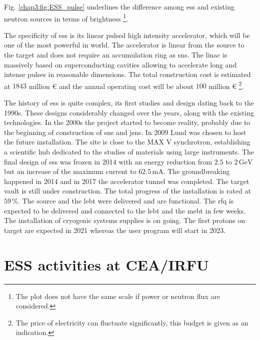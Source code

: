 \begin{refsection}
  Fig. \ref{chap3:fig:ESS_pulse} underlines the difference among \acrshort{ess} and existing neutron sources in terms of brightness \footnote{The plot does not have the same scale if power or neutron flux are considered.}.
  
  
  The specificity of \acrshort{ess} is its linear pulsed high intensity accelerator, which will be one of the most powerful in world. The accelerator is linear from the source to the target and does not require an accumulation ring as \acrshort{sns}. The linac is massively based on superconducting cavities allowing to accelerate long and intense pulses in reasonable dimensions. The total construction cost is estimated at $1843$ million € and the annual operating cost will be about $100$ million € \footnote{The price of electricity can fluctuate significantly, this budget is given as an indication.}.


  The history of \acrshort{ess} is quite complex, its first studies and design dating back to the 1990s. These designs considerably changed over the years, along with the existing technologies.
  In the 2000s the project started to become reality, probably due to the beginning of construction of \acrshort{sns} and \acrshort{jsns}.
  In 2009 Lund was chosen to host the future installation. The site is close to the MAX V synchrotron, establishing a scientific hub dedicated to the studies of materials using large instruments.
  The final design of \acrshort{ess} was frozen in 2014 with an energy reduction from $2.5$ to $2\,\mathrm{GeV}$ but an increase of the maximum current to $62.5\,\mathrm{mA}$. The groundbreaking happened in 2014 and in 2017 the accelerator tunnel was completed. The target vault is still under construction. The total progress of the installation is rated at $59\,\mathrm{\%}$. The source and the \acrshort{lebt} were delivered and are functional. The \acrshort{rfq} is expected to be delivered and connected to the \acrshort{lebt} and the \acrshort{mebt} in few weeks. The installation of cryogenic systems supplies is on going. The first protons on target are expected in 2021 whereas the user program will start in 2023.

  \section{ESS activities at CEA/IRFU}


\end{refsection}
